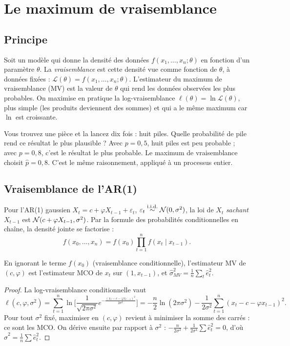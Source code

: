 \section{Le maximum de vraisemblance}

\subsection{Principe}

Soit un modèle qui donne la densité des données $f(x_1,\dots,x_n;\theta)$ en fonction d'un paramètre $\theta$. La \emph{vraisemblance} est cette densité vue comme fonction de $\theta$, à données fixées : $\mathcal L(\theta) = f(x_1,\dots,x_n;\theta)$. L'estimateur du maximum de vraisemblance (MV) est la valeur de $\theta$ qui rend les données observées les plus probables. On maximise en pratique la log-vraisemblance $\ell(\theta) = \ln\mathcal L(\theta)$, plus simple (les produits deviennent des sommes) et qui a le même maximum car $\ln$ est croissante.

\begin{intuition}
Vous trouvez une pièce et la lancez dix fois : huit piles. Quelle probabilité de pile rend ce résultat le plus plausible ? Avec $p = 0{,}5$, huit piles est peu probable ; avec $p = 0{,}8$, c'est le résultat le plus probable. Le maximum de vraisemblance choisit $\hat p = 0{,}8$. C'est le même raisonnement, appliqué à un processus entier.
\end{intuition}

\subsection{Vraisemblance de l'AR(1)}

Pour l'AR(1) gaussien $X_t = c + \varphi X_{t-1} + \varepsilon_t$, $\varepsilon_t\overset{\text{i.i.d.}}{\sim}\mathcal{N}(0,\sigma^2)$, la loi de $X_t$ \emph{sachant} $X_{t-1}$ est $\mathcal{N}(c+\varphi X_{t-1},\sigma^2)$. Par la formule des probabilités conditionnelles en chaîne, la densité jointe se factorise :
\[
f(x_0,\dots,x_n) = f(x_0)\prod_{t=1}^n f(x_t\mid x_{t-1}).
\]

\begin{proposition}\label{c2:prop:mlear1}
En ignorant le terme $f(x_0)$ (vraisemblance \og conditionnelle\fg), l'estimateur MV de $(c,\varphi)$ est l'estimateur MCO de $x_t$ sur $(1, x_{t-1})$, et $\hat\sigma^2_{MV} = \frac1n\sum_t \hat e_t^2$.
\end{proposition}
\begin{proof}
La log-vraisemblance conditionnelle vaut
\[
\ell(c,\varphi,\sigma^2) = \sum_{t=1}^n \ln\Big[\frac{1}{\sqrt{2\pi\sigma^2}}e^{-\frac{(x_t-c-\varphi x_{t-1})^2}{2\sigma^2}}\Big] = -\frac n2\ln(2\pi\sigma^2) - \frac{1}{2\sigma^2}\sum_{t=1}^n(x_t - c - \varphi x_{t-1})^2.
\]
Pour tout $\sigma^2$ fixé, maximiser en $(c,\varphi)$ revient à minimiser la somme des carrés : ce sont les MCO. On dérive ensuite par rapport à $\sigma^2$ : $-\frac{n}{2\sigma^2} + \frac{1}{2\sigma^4}\sum\hat e_t^2 = 0$, d'où $\hat\sigma^2 = \frac1n\sum\hat e_t^2$.
\end{proof}

